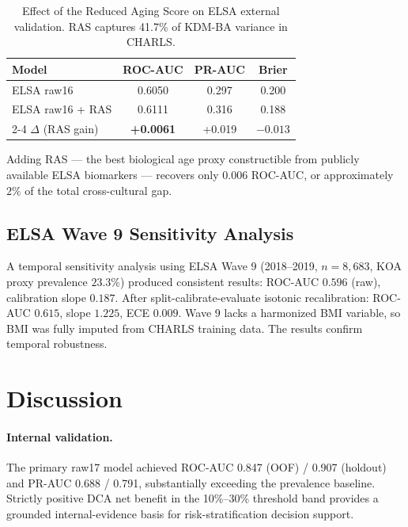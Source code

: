 \documentclass[11pt,a4paper]{article}
\begin{document}
\begin{table}[h!]
\centering
\small
\caption{Effect of the Reduced Aging Score on ELSA external validation.
RAS captures 41.7\% of KDM-BA variance in CHARLS.}
\label{tab:ras}
\begin{tabular}{lccc}
\toprule
Model & ROC-AUC & PR-AUC & Brier \\
\midrule
ELSA raw16              & 0.6050 & 0.297 & 0.200 \\
ELSA raw16 + RAS        & 0.6111 & 0.316 & 0.188 \\
\cmidrule{2-4}
$\Delta$ (RAS gain)     & \textbf{+0.0061} & +0.019 & $-0.013$ \\
\bottomrule
\end{tabular}
\end{table}

Adding RAS --- the best biological age proxy constructible from publicly available
ELSA biomarkers --- recovers only $0.006$ ROC-AUC, or approximately $2\%$ of the
total cross-cultural gap.

\subsection{ELSA Wave 9 Sensitivity Analysis}
A temporal sensitivity analysis using ELSA Wave 9 (2018--2019, $n=8{,}683$, KOA proxy
prevalence $23.3\%$) produced consistent results: ROC-AUC $0.596$ (raw), calibration
slope $0.187$. After split-calibrate-evaluate isotonic recalibration: ROC-AUC $0.615$,
slope $1.225$, ECE $0.009$. Wave 9 lacks a harmonized BMI variable, so BMI was fully
imputed from CHARLS training data. The results confirm temporal robustness.

\section{Discussion}

\paragraph{Internal validation.}
The primary raw17 model achieved ROC-AUC 0.847 (OOF) / 0.907 (holdout) and PR-AUC 0.688 / 0.791,
substantially exceeding the prevalence baseline. Strictly positive DCA net benefit in the 10\%--30\%
threshold band provides a grounded internal-evidence basis for risk-stratification decision support.
\end{document}
